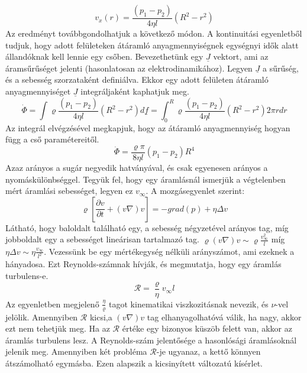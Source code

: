 \documentclass[a4paper,12pt]{article}
\begin{document}
\begin{equation}
v_x(r)=\frac{(p_1-p_2)}{4\eta l}(R^2-r^2)
\end{equation}
Az eredményt továbbgondolhatjuk a következő módon. A kontinuitási egyenletből tudjuk, hogy adott felületeken átáramló anyagmennyiségnek egységnyi idők alatt állandóknak kell lennie egy csőben. Bevezethetünk egy $\underline{J}$ vektort, ami az áramsűrűséget jelenti (hasonlatosan az elektrodinamikához). Legyen $\underline{J}$ a sűrűség, és a sebesség szorzataként definiálva. Ekkor egy adott felületen átáramló anyagmennyiséget $\underline{J}$ integráljaként kaphatjuk meg.
\begin{equation}
\dot{\Phi}=\int\varrho\frac{(p_1-p_2)}{4\eta l}(R^2-r^2)d\underline{f}=\int_{0}^{R}\varrho\frac{(p_1-p_2)}{4\eta l}(R^2-r^2)2\pi rdr
\end{equation}
Az integrál elvégzésével megkapjuk, hogy az átáramló anyagmennyiség hogyan függ a cső paramétereitől.
\begin{equation}
\dot{\Phi}=\frac{\varrho\pi}{8\eta l}(p_1-p_2)R^4
\end{equation}
Azaz arányos a sugár negyedik hatványával, és csak egyenesen arányos a nyomáskülönbséggel.
Tegyük fel, hogy egy áramlásnál ismerjük a végtelenben mért áramlási sebességet, legyen ez $v_{\infty}$. A mozgásegyenlet szerint:
\begin{equation}
\varrho\left[\frac{\partial v}{\partial t}+(v\nabla)v\right]=-grad(p)+\eta\Delta v
\end{equation}
Látható, hogy baloldalt található egy, a sebesség négyzetével arányos tag, míg jobboldalt egy a sebességet lineárisan tartalmazó tag. $\varrho(v\nabla)v\sim\varrho\frac{v_{\infty}^2}{l}$ míg $\eta\Delta v\sim\eta\frac{v_{\infty}}{l^2}$. Vezessünk be egy mértékegység nélküli arányszámot, ami ezeknek a hányadosa. Ezt Reynolds-számnak hívják, és megmutatja, hogy egy áramlás turbulens-e.
\begin{equation}
\mathcal{R}=\frac{\varrho}{\eta}v_{\infty}l
\end{equation}
Az egyenletben megjelenő $\frac{\eta}{\varrho}$ tagot kinematikai viszkozitásnak nevezik, és $\nu$-vel jelölik. Amennyiben $\mathcal{R}$ kicsi,a $(v\nabla)v$ tag elhanyagolhatóvá válik, ha nagy, akkor ezt nem tehetjük meg. Ha az $\mathcal{R}$ értéke egy bizonyos küszöb felett van, akkor az áramlás turbulens lesz. A Reynolds-szám jelentősége a hasonlósági áramlásoknál jelenik meg. Amennyiben két probléma $\mathcal{R}$-je ugyanaz, a kettő könnyen átszámolható egymásba. Ezen alapszik a kicsinyített változatú kísérlet.
\pagebreak
\end{document}
